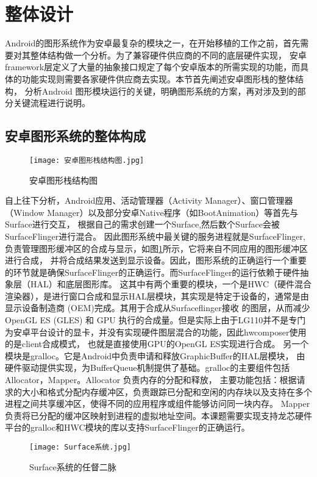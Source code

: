 
\section{整体设计}
Android的图形系统作为安卓最复杂的模块之一，在开始移植的工作之前，首先需要对其整体结构做一个分析。为了兼容硬件供应商的不同的底层硬件实现，
安卓framework层定义了大量的抽象接口规定了每个安卓版本的所需实现的功能，而具体的功能实现则需要各家硬件供应商去实现。本节首先阐述安卓图形栈的整体结构，
分析Android 图形模块运行的关键，明确图形系统的方案，再对涉及到的部分关键流程进行说明。
\subsection{安卓图形系统的整体构成}
\begin{figure}[h]
  \centering
  \texttt{[image: 安卓图形栈结构图.jpg]}
  \caption{安卓图形栈结构图}    
  \label{fig:安卓图形栈结构图}
\end{figure}
自上往下分析，Android应用、活动管理器（Activity Manager）、窗口管理器（Window Manager）以及部分安卓Native程序（如BootAnimation）等首先与Surface进行交互，
根据自己的需求创建一个Surface,然后数个Surface会被SurfaceFlinger进行混合\cite{邓凡平2011深入理解}。
因此图形系统中最关键的服务进程就是SurfaceFlinger,负责管理图形缓冲区的合成与显示，如图\ref{fig:安卓图形栈结构图}所示，它将来自不同应用的图形缓冲区进行合成，
并将合成结果发送到显示设备。因此，图形系统的正确运行一个重要的环节就是确保SurfaceFlinger的正确运行。而SurfaceFlinger的运行依赖于硬件抽象层（HAL）和底层图形库。
这其中有两个重要的模块，一个是HWC（硬件混合渲染器），是进行窗口合成和显示HAL层模块，其实现是特定于设备的，通常是由显示设备制造商 (OEM)完成。其用于合成从Surfaceflinger接收
的图层，从而减少OpenGL ES (GLES) 和 GPU 执行的合成量。但是实际上由于LG110并不是专门为安卓平台设计的显卡，并没有实现硬件图层混合的功能，因此hwcomposer使用的是client合成模式，
也就是直接使用GPU的OpenGL ES实现进行合成。
另一个模块是gralloc。它是Android中负责申请和释放GraphicBuffer的HAL层模块，
由硬件驱动提供实现，为BufferQueue机制提供了基础。gralloc的主要组件包括Allocator，Mapper。Allocator 负责内存的分配和释放，
主要功能包括：根据请求的大小和格式分配内存缓冲区，负责跟踪已分配和空闲的内存块以及支持在多个进程之间共享缓冲区，使得不同的应用程序或组件能够访问同一块内存。
Mapper负责将已分配的缓冲区映射到进程的虚拟地址空间。本课题需要实现支持龙芯硬件平台的gralloc和HWC模块的库以支持SurfaceFlinger的正确运行。
\begin{figure}[h]
  \centering
  \texttt{[image: Surface系统.jpg]}
  \caption{Surface系统的任督二脉}    
  \label{fig:Surface系统的任督二脉}
  \cite{邓凡平2011深入理解}
\end{figure}

